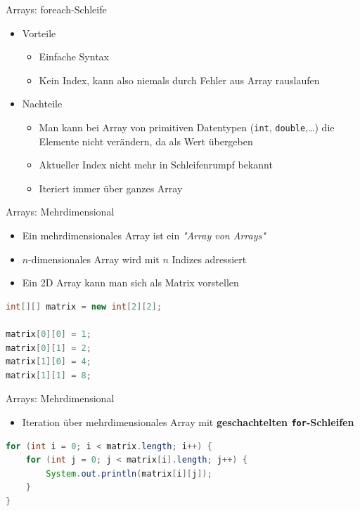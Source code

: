 \documentclass[18pt]{beamer}
\begin{document}
\begin{frame}{Arrays: foreach-Schleife}
    \begin{itemize}
        \item Vorteile
        \begin{itemize}
            \item Einfache Syntax
            \item Kein Index, kann also niemals durch Fehler aus Array rauslaufen
        \end{itemize}
        \vspace{.2in}
        \item Nachteile
        \begin{itemize}
            \item Man kann bei Array von primitiven Datentypen (\texttt{int}, \texttt{double},\dots) die Elemente nicht verändern, da als Wert übergeben
            \item Aktueller Index nicht mehr in Schleifenrumpf bekannt
            \item Iteriert immer über ganzes Array
        \end{itemize}
    \end{itemize}
\end{frame}

\begin{frame}[fragile]{Arrays: Mehrdimensional}
    \begin{itemize}
        \item Ein mehrdimensionales Array ist ein \textit{"Array von Arrays"}
        \item $n$-dimensionales Array wird mit $n$ Indizes adressiert
        \item Ein 2D Array kann man sich als Matrix vorstellen
    \end{itemize}
    \begin{exampleblock}{}
        \begin{lstlisting}[language=Java]
int[][] matrix = new int[2][2];

matrix[0][0] = 1;
matrix[0][1] = 2;
matrix[1][0] = 4;
matrix[1][1] = 8;
        \end{lstlisting}
    \end{exampleblock}
\end{frame}

\begin{frame}[fragile]{Arrays: Mehrdimensional}
    \begin{itemize}
        \item Iteration über mehrdimensionales Array mit \textbf{geschachtelten \texttt{for}-Schleifen}
    \end{itemize}
    \begin{exampleblock}{}
        \begin{lstlisting}[language=Java]
for (int i = 0; i < matrix.length; i++) {
    for (int j = 0; j < matrix[i].length; j++) {
        System.out.println(matrix[i][j]);
    }
}
        \end{lstlisting}
    \end{exampleblock}
\end{frame}
\end{document}
